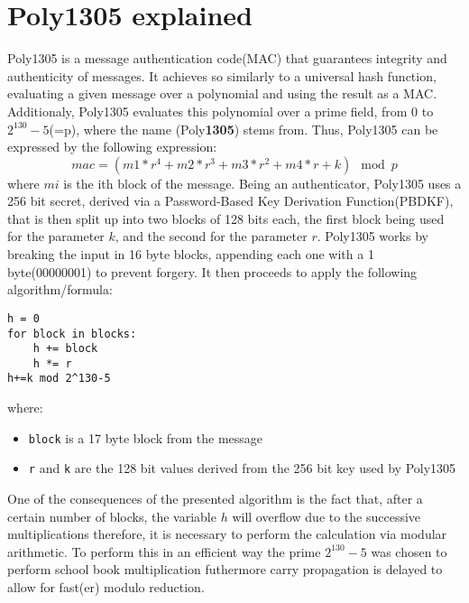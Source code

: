 \documentclass[twocolumn]{article}
\begin{document}
\section{Poly1305 explained}
Poly1305 is a message authentication code(MAC) that guarantees integrity and authenticity of messages. It achieves so similarly to a universal hash function, evaluating 
a given message over a polynomial and using the result as a MAC. Additionaly, Poly1305 evaluates this polynomial over a prime field, from 0 to $2^{130}-5$(=p), where the 
name (Poly\textbf{1305}) stems from. Thus, Poly1305 can be expressed by the following expression: $$mac = (m1 * r^4 + m2 * r^3 + m3 * r^2 + m4 * r + k) \mod{p} $$ where $mi$
is the ith block of the message. Being an authenticator, Poly1305 uses a 256 bit secret, derived via a Password-Based Key Derivation Function(PBDKF), that is then split up 
into two blocks of 128 bits each, the first block being used for the parameter $k$, and the second for the parameter $r$. Poly1305 works by breaking the input in 16 byte 
blocks, appending each one with a 1 byte(00000001) to prevent forgery. It then proceeds to apply the following algorithm/formula:

\begin{verbatim}
h = 0
for block in blocks:
    h += block
    h *= r
h+=k mod 2^130-5
\end{verbatim}

where:
\begin{itemize}
    \item \texttt{block} is a 17 byte block from the message 
    \item \texttt{r} and \texttt{k} are the 128 bit values derived from the 256 bit key used by Poly1305
\end{itemize}

One of the consequences of the presented algorithm is the fact that, after a certain number of blocks, the variable $h$ will overflow due to the successive multiplications 
therefore, it is necessary to perform the calculation via modular arithmetic. To perform this in an efficient way the prime $2^{130}-5$ was chosen to perform school book 
multiplication futhermore carry propagation is delayed to allow for fast(er) modulo reduction.
\end{document}

